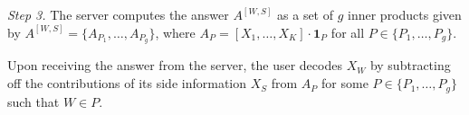 \documentclass[letterpaper, 10 pt, conference]{ieeeconf}
\newcommand\salim[1]{\add[salim]{#1}}
\newcommand\swanand[1]{\notee[swanand]{#1}}
\newcommand{\A}[2]{A^{[#1,#2]}} %
\begin{document}

{\it Step 3.} The server computes the answer $\A{W}{S}$ as a set of $g$ inner products given by $\A{W}{S} = \{A_{P_1},\dots,A_{P_{g}}\}$, where $A_P = [X_1,\dots,X_K]\cdot \mathbf{1}_{P}$ for all $P\in \{P_1,\dots,P_{g}\}$.

Upon receiving the answer from the server, the user decodes $X_W$ by subtracting off the contributions of its side information $X_S$ from $A_{P}$ for some $P\in \{P_1,\dots,P_g\}$ such that $W\in P$.
\end{document}
